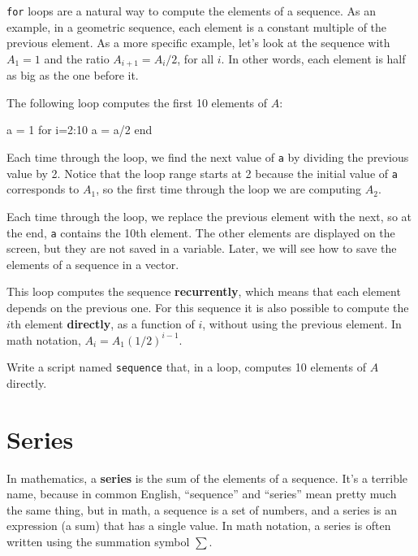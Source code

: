 \documentclass[main.tex]{subfiles}
\begin{document}
{\tt for} loops are a natural way to compute the elements of a sequence.
As an example, in a geometric sequence, each element is a constant
multiple of the previous element.  As a more specific example, let's
look at the sequence with $A_1 = 1$ and the ratio $A_{i+1} = A_i/2$,
for all $i$.  In other words, each element is half as big as the one
before it.

The following loop computes the first 10 elements of $A$:

\begin{code}
a = 1
for i=2:10
    a = a/2
end
\end{code}

Each time through the loop, we find the next value of {\tt a}
by dividing the previous value by 2.  Notice that the loop
range starts at 2 because the initial value of {\tt a} corresponds
to $A_1$, so the first time through the loop we are computing
$A_2$.

Each time through the loop, we replace the previous element with
the next, so at the end, {\tt a} contains the 10th element.  The
other elements are displayed on the screen, but they are not saved
in a variable.  Later, we will see how to save the elements
of a sequence in a vector.


This loop computes the sequence {\bf recurrently}, which means
that each element depends on the previous one.
For this sequence it is also possible to compute the $i$th element
{\bf directly}, as a function of $i$, without using the previous element.
In math notation, $A_i = A_1 (1/2)^{i-1}$. 

\begin{ex}
Write a script named {\tt sequence} that, in a loop, 
computes 10 elements of $A$ directly.
\end{ex}


\section{Series}
\label{sect:series}

In mathematics, a {\bf series} is the sum of the elements of
a sequence.  It's a terrible name, because in common English,
``sequence'' and ``series'' mean pretty much the same thing, but in
math, a sequence is a set of numbers, and a series is an expression
(a sum) that has a single value.  In math notation, a series
is often written using the summation symbol $\sum$.
\end{document}
